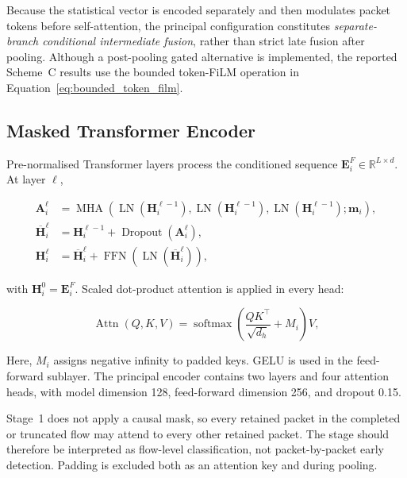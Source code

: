 \documentclass[11pt,fleqn]{report}
\begin{document}
Because the statistical vector is encoded separately and then modulates packet tokens before self-attention, the principal configuration constitutes \emph{separate-branch conditional intermediate fusion}, rather than strict late fusion after pooling. Although a post-pooling gated alternative is implemented, the reported Scheme~C results use the bounded token-FiLM operation in Equation~\ref{eq:bounded_token_film}.

\subsection{Masked Transformer Encoder}
\label{subsubsec:stage1_transformer}

Pre-normalised Transformer layers process the conditioned sequence $\mathbf{E}^{F}_i\in\mathbb{R}^{L\times d}$. At layer $\ell$,

\begin{align}
    \mathbf{A}^{\ell}_i
    &=\operatorname{MHA}
      \left(
        \operatorname{LN}(\mathbf{H}^{\ell-1}_i),
        \operatorname{LN}(\mathbf{H}^{\ell-1}_i),
        \operatorname{LN}(\mathbf{H}^{\ell-1}_i);
        \mathbf{m}_i
      \right),\\
    \overline{\mathbf{H}}^{\ell}_i
    &=\mathbf{H}^{\ell-1}_i
      +\operatorname{Dropout}(\mathbf{A}^{\ell}_i),\\
    \mathbf{H}^{\ell}_i
    &=\overline{\mathbf{H}}^{\ell}_i
      +\operatorname{FFN}
       \left(\operatorname{LN}(\overline{\mathbf{H}}^{\ell}_i)\right),
    \label{eq:stage1_transformer_layer}
\end{align}

with $\mathbf{H}^{0}_i=\mathbf{E}^{F}_i$. Scaled dot-product attention is applied in every head:

\begin{equation}
    \operatorname{Attn}(Q,K,V)
    =\operatorname{softmax}
      \left(
        \frac{QK^{\top}}{\sqrt{d_h}}+M_i
      \right)V,
    \label{eq:scaled_dot_product_attention}
\end{equation}

Here, $M_i$ assigns negative infinity to padded keys. GELU is used in the feed-forward sublayer. The principal encoder contains two layers and four attention heads, with model dimension 128, feed-forward dimension 256, and dropout 0.15.

Stage~1 does not apply a causal mask, so every retained packet in the completed or truncated flow may attend to every other retained packet. The stage should therefore be interpreted as flow-level classification, not packet-by-packet early detection. Padding is excluded both as an attention key and during pooling.
\end{document}
